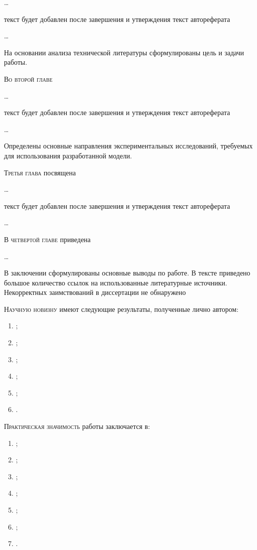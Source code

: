 \ldots

текст будет добавлен после завершения и утверждения текст автореферата

\ldots

На основании анализа технической литературы сформулированы цель и задачи работы.

\textsc{Во второй главе}

\ldots

текст будет добавлен после завершения и утверждения текст автореферата

\ldots

Определены основные направления экспериментальных исследований, требуемых для использования разработанной модели.

\textsc{Третья глава} посвящена

\ldots

текст будет добавлен после завершения и утверждения текст автореферата

\ldots


\textsc{В четвертой главе} приведена

\ldots

В заключении сформулированы основные выводы по работе.
В тексте приведено большое количество ссылок на использованные литературные источники. Некорректных заимствований в диссертации не обнаружено

\textsc{Научную новизну} имеют следующие результаты, полученные лично автором:

\begin{enumerate}
  \item {\noviznaONE};
  \item {\noviznaTWO};
  \item {\noviznaTHREE};
  \item {\noviznaFOUR};
  \item {\noviznaFIVE};
  \item {\noviznaSIX}.
\end{enumerate}

\textsc{Практическая значимость} работы заключается в:

\begin{enumerate}
    \item {\znachimostONE};
    \item {\znachimostTWO};
    \item {\znachimostTHREE};
    \item {\znachimostFOUR};
    \item {\znachimostFIVE};
    \item {\znachimostSIX};
    \item {\znachimostSEVEN}.
\end{enumerate}

